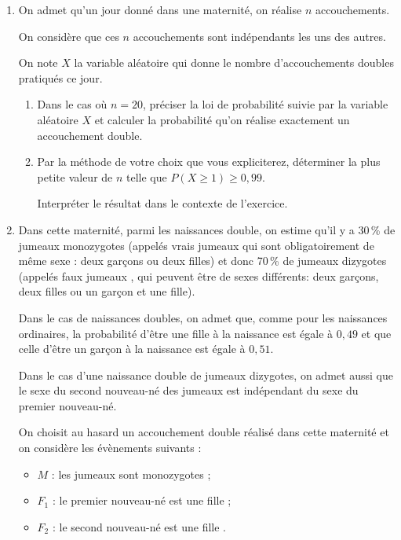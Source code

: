\begin{enumerate}[resume]
\item On admet qu'un jour donné dans une maternité, on réalise $n$ accouchements.

On considère que ces $n$ accouchements sont indépendants les uns des autres.

On note $X$ la variable aléatoire qui donne le nombre d'accouchements doubles pratiqués ce
jour.
	\begin{enumerate}
		\item Dans le cas où $n =  20$, préciser la loi de probabilité suivie par la variable aléatoire $X$ et calculer la probabilité qu'on réalise exactement un accouchement double.
		\item Par la méthode de votre choix que vous expliciterez, déterminer la plus petite valeur de $n$ telle que $P(X \geqslant 1) \geqslant  0,99$.

Interpréter le résultat dans le contexte de l'exercice.
	\end{enumerate}
\item Dans cette maternité, parmi les naissances double, on estime qu'il y a 30\,\% de jumeaux monozygotes (appelés \og  vrais jumeaux \fg{}  qui sont obligatoirement de même sexe : deux garçons ou deux filles) et donc 70\,\% de jumeaux dizygotes (appelés \og  faux jumeaux \fg, qui peuvent être de sexes différents: deux garçons, deux filles ou un garçon et une fille).

Dans le cas de naissances doubles, on admet que, comme pour les naissances ordinaires, la probabilité d'être une fille à la naissance est égale à $0,49$ et que celle d'être un garçon à la naissance est égale à $0,51$.

Dans le cas d'une naissance double de jumeaux dizygotes, on admet aussi que le sexe du
second nouveau-né des jumeaux est indépendant du sexe du premier nouveau-né.

On choisit au hasard un accouchement double réalisé dans cette maternité et on considère les évènements suivants :

\begin{itemize}
\item[$\bullet~~$]$M$ : \og  les jumeaux sont monozygotes \fg{}  ;
\item[$\bullet~~$]$F_1$ : \og le premier nouveau-né est une fille \fg{} ;
\item[$\bullet~~$]$F_2$ : \og le second nouveau-né est une fille \fg.
\end{itemize}


\end{enumerate}
